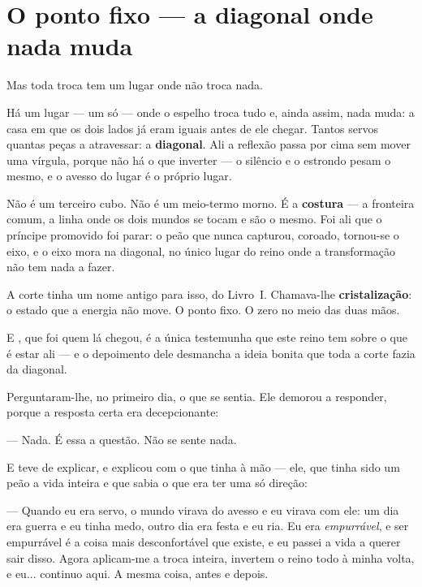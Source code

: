 \documentclass[livro.tex]{subfiles}
\begin{document}
\chapter{O ponto fixo --- a diagonal onde nada muda}

Mas toda troca tem um lugar onde não troca nada.

Há um lugar --- um só --- onde o espelho troca tudo e, ainda assim, nada muda: a casa
em que os dois lados já eram iguais antes de ele chegar. Tantos servos quantas peças a
atravessar: a \textbf{diagonal}. Ali a reflexão passa por cima sem
mover uma vírgula, porque não há o que inverter --- o silêncio e o estrondo pesam o
mesmo, e o avesso do lugar é o próprio lugar.

\medskip

Não é um terceiro cubo. Não é um meio-termo morno. É a \textbf{costura} --- a
fronteira comum, a linha onde os dois mundos se tocam e são o mesmo. Foi ali que o
príncipe promovido foi parar: o peão que nunca capturou, coroado, tornou-se o eixo, e
o eixo mora na diagonal, no único lugar do reino onde a transformação não
tem nada a fazer.

\medskip

A corte tinha um nome antigo para isso, do Livro~I. Chamava-lhe
\textbf{cristalização}: o estado que a energia não move. O ponto fixo. O zero no meio
das duas mãos.

\medskip

E \Lck , que foi quem lá chegou, é a única testemunha que este reino tem sobre o que é
estar ali --- e o depoimento dele desmancha a ideia bonita que toda a corte fazia da
diagonal.

\medskip

Perguntaram-lhe, no primeiro dia, o que se sentia. Ele demorou a responder, porque a
resposta certa era decepcionante:

--- Nada. É essa a questão. Não se sente nada.

E teve de explicar, e explicou com o que tinha à mão --- ele, que tinha sido um peão a
vida inteira e que sabia o que era ter uma só direção:

--- Quando eu era servo, o mundo virava do avesso e eu virava com ele: um dia era guerra e
eu tinha medo, outro dia era festa e eu ria. Eu era \emph{empurrável}, e ser empurrável é
a coisa mais desconfortável que existe, e eu passei a vida a querer sair disso. Agora
aplicam-me a troca inteira, invertem o reino todo à minha volta, e eu... continuo aqui. A
mesma coisa, antes e depois.
\end{document}

